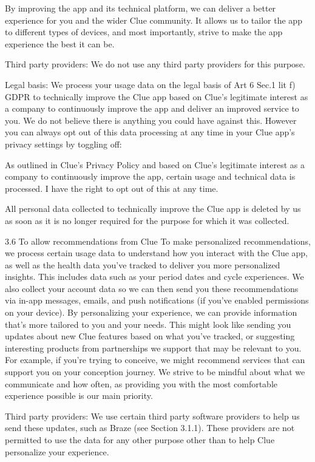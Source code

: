 By improving the app and its technical platform, we can deliver a better experience for you and the wider Clue community. It allows us to tailor the app to different types of devices, and most importantly, strive to make the app experience the best it can be.

Third party providers: We do not use any third party providers for this purpose.

Legal basis: We process your usage data on the legal basis of Art 6 Sec.1 lit f) GDPR to technically improve the Clue app based on Clue’s legitimate interest as a company to continuously improve the app and deliver an improved service to you. We do not believe there is anything you could have against this. However you can always opt out of this data processing at any time in your Clue app’s privacy settings by toggling off:

As outlined in Clue’s Privacy Policy and based on Clue’s legitimate interest as a company to continuously improve the app, certain usage and technical data is processed. I have the right to opt out of this at any time.

All personal data collected to technically improve the Clue app is deleted by us as soon as it is no longer required for the purpose for which it was collected.

3.6 To allow recommendations from Clue
To make personalized recommendations, we process certain usage data to understand how you interact with the Clue app, as well as the health data you’ve tracked to deliver you more personalized insights. This includes data such as your period dates and cycle experiences. We also collect your account data so we can then send you these recommendations via in-app messages, emails, and push notifications (if you’ve enabled permissions on your device). By personalizing your experience, we can provide information that’s more tailored to you and your needs. This might look like sending you updates about new Clue features based on what you’ve tracked, or suggesting interesting products from partnerships we support that may be relevant to you. For example, if you’re trying to conceive, we might recommend services that can support you on your conception journey. We strive to be mindful about what we communicate and how often, as providing you with the most comfortable experience possible is our main priority.

Third party providers: We use certain third party software providers to help us send these updates, such as Braze (see Section 3.1.1). These providers are not permitted to use the data for any other purpose other than to help Clue personalize your experience.

